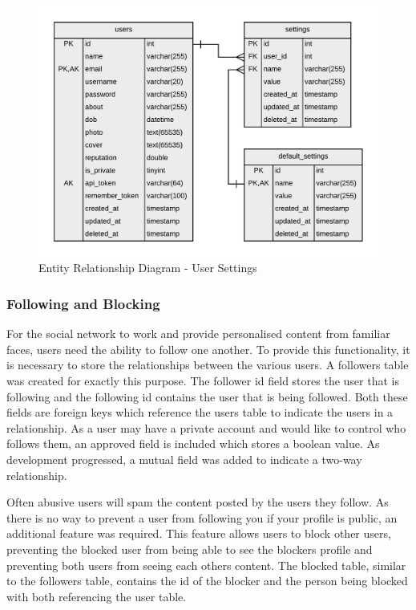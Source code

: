\begin{figure}[H]
  \centering
  \includegraphics[width=1.0\textwidth]{Images/Design/Database/Settings}
  \caption{Entity Relationship Diagram - User Settings} \label{fig:ERD_Settings}
\end{figure}

\subsubsection{Following and Blocking}

For the social network to work and provide personalised content from familiar faces, users need the ability to follow one another. To provide this functionality, it is necessary to store the relationships between the various users. A followers table was created for exactly this purpose. The follower id field stores the user that is following and the following id contains the user that is being followed. Both these fields are foreign keys which reference the users table to indicate the users in a relationship. As a user may have a private account and would like to control who follows them, an approved field is included which stores a boolean value. As development progressed, a mutual field was added to indicate a two-way relationship.

Often abusive users will spam the content posted by the users they follow. As there is no way to prevent a user from following you if your profile is public, an additional feature was required. This feature allows users to block other users, preventing the blocked user from being able to see the blockers profile and preventing both users from seeing each others content. The blocked table, similar to the followers table, contains the id of the blocker and the person being blocked with both referencing the user table.

